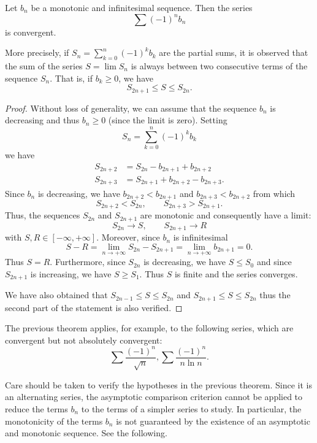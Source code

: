 \begin{theorem}
\label{th:Leibniz}%
\mymark{***}%
%
%
%
%
Let $b_n$ be a monotonic and infinitesimal sequence. Then
the series
\[
  \sum (-1)^{n} b_n
\]
is convergent.

More precisely, if $\displaystyle S_n = \sum_{k=0}^n (-1)^k b_k$
are the partial sums,
it is observed that the sum of the series $S= \lim S_n$ is always between
two consecutive terms of the sequence $S_n$.
That is, if $b_k\ge 0$, we have
\[
  S_{2n+1} \le S \le S_{2n}.
\]
\end{theorem}
%
\begin{proof}
\mymark{***}
Without loss of generality, we can assume that the sequence $b_n$ is decreasing
and thus $b_n \ge 0$ (since the limit is zero).
Setting
\[
 S_n = \sum_{k=0}^n (-1)^k b_k
\]
we have
\begin{align*}
  S_{2n+2} &= S_{2n} - b_{2n+1} + b_{2n+2} \\
  S_{2n+3} &= S_{2n+1} + b_{2n+2} - b_{2n+3}.
\end{align*}
Since $b_n$ is decreasing, we have $b_{2n+2} < b_{2n+1}$ and $b_{2n+3} <
b_{2n+2}$ from which
\[
  S_{2n+2} < S_{2n}, \qquad S_{2n+3} > S_{2n+1}.
\]
Thus, the sequences $S_{2n}$ and $S_{2n+1}$ are monotonic and consequently
have a limit:
\[
  S_{2n} \to S, \qquad S_{2n+1} \to R
\]
with $S, R  \in [-\infty, +\infty]$.
Moreover, since $b_n$ is infinitesimal
\[
  S - R
  = \lim_{n\to +\infty} S_{2n} - S_{2n+1}
  = \lim_{n\to +\infty} b_{2n+1} = 0.
\]
Thus $S=R$. Furthermore, since $S_{2n}$ is decreasing, we have
$S \le S_0$ and since $S_{2n+1}$ is increasing, we have $S\ge S_1$.
Thus $S$ is finite and the series converges.

We have also obtained that
$S_{2n-1} \le S \le S_{2n}$ and $S_{2n+1} \le S \le S_{2n}$
thus the second part of the statement is also verified.
\end{proof}

The previous theorem applies, for example, to the following series,
which are convergent but not absolutely convergent:
\[
   \sum \frac{(-1)^n}{\sqrt n}, 
   \sum \frac{(-1)^n}{n\ln n}.
\]

Care should be taken to verify the hypotheses in the previous theorem.
Since it is an alternating series, the asymptotic comparison criterion cannot be
applied to reduce the terms $b_n$ to the terms of a simpler series to study.
In particular, the monotonicity of the terms $b_n$ is not guaranteed by the
existence of an asymptotic and monotonic sequence.
See the following.


